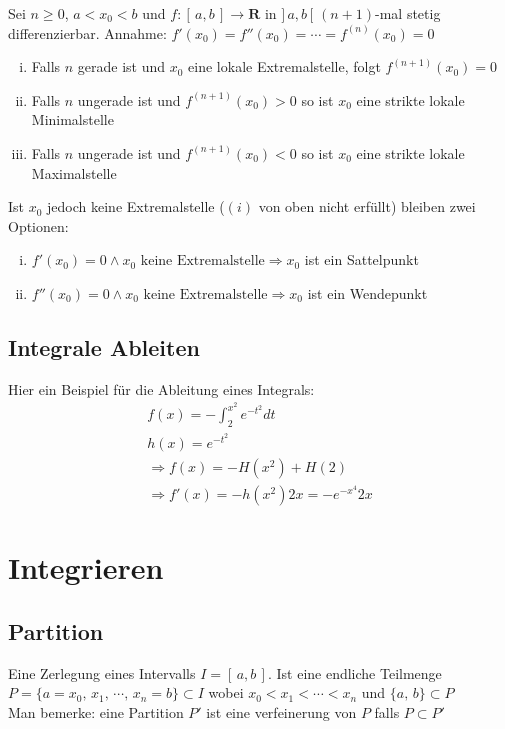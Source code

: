 \documentclass[8pt]{article}
\begin{document}
\begin{multicols*}{3}
Sei $n \geq 0$, $a < x_0 < b$ und $f: [\,a, b\,] \rightarrow \mathbf{R}$ in $]\,a, b\,[$ $(n+1)$-mal stetig differenzierbar.
Annahme: $f'(x_0) = f''(x_0) = \cdots = f^{(n)}(x_0) = 0$
\begin{enumerate}[(i)]
  \item Falls $n$ gerade ist und $x_0$ eine lokale Extremalstelle, folgt $f^{(n+1)}(x_0) = 0$
  \item Falls $n$ ungerade ist und $f^{(n+1)}(x_0) > 0$ so ist $x_0$ eine strikte lokale Minimalstelle
  \item Falls $n$ ungerade ist und $f^{(n+1)}(x_0) < 0$ so ist $x_0$ eine strikte lokale Maximalstelle
\end{enumerate}
Ist $x_0$ jedoch keine Extremalstelle ($(i)$ von oben nicht erfüllt) bleiben zwei Optionen:
\begin{enumerate}[(i)]
  \item $f'(x_0) = 0 \land x_0 \text{ keine Extremalstelle} \Rightarrow x_0$ ist ein Sattelpunkt
  \item $f''(x_0) = 0 \land x_0 \text{ keine Extremalstelle} \Rightarrow x_0$ ist ein Wendepunkt
\end{enumerate}

\subsection{Integrale Ableiten}

Hier ein Beispiel für die Ableitung eines Integrals:
\begin{align*}
  f(x) = -\int_2^{x^2} e^{-t^2} dt\\
  h(x) = e^{-t^2}\\
  \Rightarrow f(x) = - H(x^2) + H(2)\\
  \Rightarrow f'(x) = - h(x^2) 2x = -e^{-x^4} 2x
\end{align*}
\section{Integrieren}
\hypertarget{sec:4}{}

\subsection{Partition}

Eine Zerlegung eines Intervalls $I = [\,a, b\,]$. Ist eine endliche Teilmenge
$P = \{a = x_0,\, x_1,\, \cdots,\, x_n = b\} \subset I$ wobei $x_0 < x_1 < \cdots < x_n$ und $\{a,\, b\} \subset P$
\\
Man bemerke: eine Partition $P'$ ist eine verfeinerung von $P$ falls $P \subset P'$


\end{multicols*}
\end{document}
